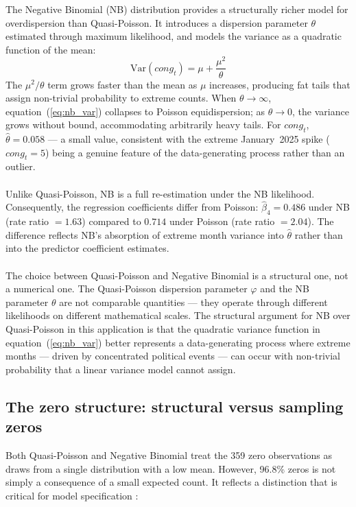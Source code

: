 \documentclass[11pt]{article}
\begin{document}
The Negative Binomial (NB) distribution \citep{Hilbe2011} provides a structurally richer model for overdispersion than Quasi-Poisson. It introduces a dispersion parameter $\theta$ estimated through maximum
likelihood, and models the variance as a quadratic function of the mean:
\begin{equation}
  \mathrm{Var}(\mathit{cong}_t) = \mu + \frac{\mu^2}{\theta}
  \label{eq:nb_var}
\end{equation}
The $\mu^2/\theta$ term grows faster than the mean as $\mu$ increases, producing fat tails that assign non-trivial probability to extreme counts. When $\theta \to \infty$, equation~(\ref{eq:nb_var}) collapses
to Poisson equidispersion; as $\theta \to 0$, the variance grows without bound, accommodating arbitrarily heavy tails. For $\mathit{cong}_t$,
$\hat{\theta} = 0.058$ --- a small value, consistent with the extreme January~2025 spike ($\mathit{cong}_t = 5$) being a genuine feature of the data-generating process rather than an outlier.\\
\\
Unlike Quasi-Poisson, NB is a full re-estimation under the NB likelihood. Consequently, the regression coefficients differ from Poisson: $\hat{\beta}_4 = 0.486$ under NB (rate ratio $= 1.63$)
compared to $0.714$ under Poisson (rate ratio $= 2.04$). The difference reflects NB's absorption of extreme month variance into $\hat{\theta}$ rather than into the predictor coefficient estimates.\\
\\
The choice between Quasi-Poisson and Negative Binomial is a structural one, not a numerical one. The Quasi-Poisson dispersion parameter $\varphi$ and the NB parameter $\theta$ are not comparable quantities
--- they operate through different likelihoods on different mathematical scales. The structural argument for NB over Quasi-Poisson in this application is that the quadratic variance function in equation~(\ref{eq:nb_var}) better represents a data-generating process where extreme months --- driven by concentrated political events --- can occur with non-trivial probability that a linear variance model cannot assign.

\subsection{The zero structure: structural versus sampling zeros}
\label{sec:zeros}

Both Quasi-Poisson and Negative Binomial treat the 359 zero observations as draws from a single distribution with a low mean. However, 96.8\% zeros is not simply a consequence
of a small expected count. It reflects a distinction that is critical for model specification \citep{Mullahy1986, Welsh2000}:
\end{document}
